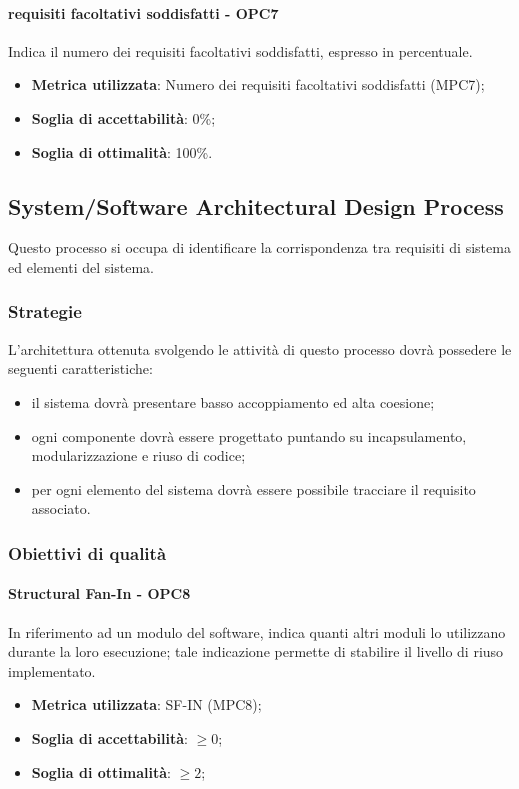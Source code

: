 \documentclass[PdQ.tex]{subfiles}
\begin{document}
			\paragraph{requisiti facoltativi soddisfatti - OPC7}
			Indica il numero dei requisiti facoltativi soddisfatti, espresso in percentuale.
			\begin{itemize}
					\item \textbf{Metrica utilizzata}: Numero dei requisiti facoltativi soddisfatti (MPC7);
					\item \textbf{Soglia di accettabilità}: 0\%;
					\item \textbf{Soglia di ottimalità}: 100\%.
			\end{itemize}
		
	\subsection{System/Software Architectural Design Process}
		Questo processo si occupa di identificare la corrispondenza tra requisiti di sistema ed elementi del sistema.
		
		\subsubsection{Strategie}
		L'architettura ottenuta svolgendo le attività di questo processo dovrà possedere le seguenti caratteristiche:
		\begin{itemize}
		\item il sistema dovrà presentare basso accoppiamento ed alta coesione;
		\item ogni componente dovrà essere progettato puntando su incapsulamento, modularizzazione e riuso di codice;
		\item per ogni elemento del sistema dovrà essere possibile tracciare il requisito associato.
		\end{itemize}
		
		\subsubsection{Obiettivi di qualità}
			\paragraph{Structural Fan-In - OPC8}
			In riferimento ad un modulo del software, indica quanti altri moduli lo utilizzano durante la
			loro esecuzione; tale indicazione permette di stabilire il livello di riuso implementato. 
			\begin{itemize}
					\item \textbf{Metrica utilizzata}: SF-IN (MPC8);
					\item \textbf{Soglia di accettabilità}: \begin{math}\geq 0\end{math};
					\item \textbf{Soglia di ottimalità}: \begin{math}\geq 2\end{math};
			\end{itemize}
\end{document}
